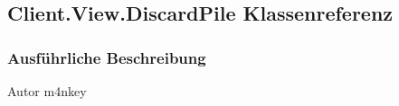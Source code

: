 \hypertarget{a00036}{\subsection{Client.\-View.\-Discard\-Pile Klassenreferenz}
\label{a00036}
}


\subsubsection{Ausführliche Beschreibung}
\begin{DoxyAuthor}{Autor}
m4nkey 
\end{DoxyAuthor}
